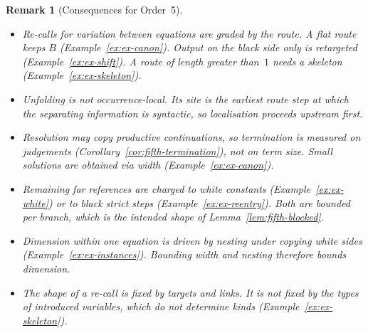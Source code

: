 \documentclass[10pt,a4paper]{article}
\theoremstyle{plain}%
\newtheorem{remark}[theorem]{Remark}
\begin{document}
\begin{remark}[Consequences for Order~5]\label{rem:ex-consequences}~
\begin{itemize}
\item Re-calls for variation between equations are graded by the route.
A flat route keeps $B$ (Example~\ref{ex:ex-canon}).
Output on the black side only is retargeted (Example~\ref{ex:ex-shift}).
A route of length greater than~$1$ needs a skeleton (Example~\ref{ex:ex-skeleton}).
\item Unfolding is not occurrence-local.
Its site is the earliest route step at which the separating information is syntactic, so localisation proceeds upstream first.
\item Resolution may copy productive continuations, so termination is measured on judgements (Corollary~\ref{cor:fifth-termination}), not on term size.
Small solutions are obtained via width (Example~\ref{ex:ex-canon}).
\item Remaining far references are charged to white constants (Example~\ref{ex:ex-white}) or to black strict steps (Example~\ref{ex:ex-reentry}).
Both are bounded per branch, which is the intended shape of Lemma~\ref{lem:fifth-blocked}.
\item Dimension within one equation is driven by nesting under copying white sides (Example~\ref{ex:ex-instances}).
Bounding width and nesting therefore bounds dimension.
\item The shape of a re-call is fixed by targets and links.
It is not fixed by the types of introduced variables, which do not determine kinds (Example~\ref{ex:ex-skeleton}).
\end{itemize}
\end{remark}

\printbibliography
\end{document}
